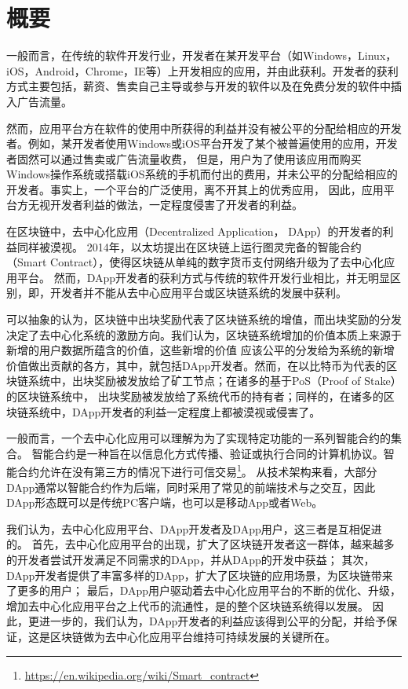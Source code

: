 \section{概要}


一般而言，在传统的软件开发行业，开发者在某开发平台（如Windows，Linux，iOS，Android，Chrome，IE等）上开发相应的应用，并由此获利。开发者的获利方式主要包括，薪资、售卖自己主导或参与开发的软件以及在免费分发的软件中插入广告流量。

然而，应用平台方在软件的使用中所获得的利益并没有被公平的分配给相应的开发者。例如，某开发者使用Windows或iOS平台开发了某个被普遍使用的应用，开发者固然可以通过售卖或广告流量收费，
但是，用户为了使用该应用而购买Windows操作系统或搭载iOS系统的手机而付出的费用，并未公平的分配给相应的开发者。事实上，一个平台的广泛使用，离不开其上的优秀应用，
因此，应用平台方无视开发者利益的做法，一定程度侵害了开发者的利益。

在区块链中，去中心化应用（Decentralized Application， DApp）的开发者的利益同样被漠视。
2014年，以太坊提出在区块链上运行图灵完备的智能合约（Smart Contract），使得区块链从单纯的数字货币支付网络升级为了去中心化应用平台。
然而，DApp开发者的获利方式与传统的软件开发行业相比，并无明显区别，即，开发者并不能从去中心应用平台或区块链系统的发展中获利。

可以抽象的认为，区块链中出块奖励代表了区块链系统的增值，而出块奖励的分发决定了去中心化系统的激励方向。我们认为，区块链系统增加的价值本质上来源于新增的用户数据所蕴含的价值，这些新增的价值
应该公平的分发给为系统的新增价值做出贡献的各方，其中，就包括DApp开发者。然而，在以比特币为代表的区块链系统中，出块奖励被发放给了矿工节点；在诸多的基于PoS（Proof of Stake）的区块链系统中，
出块奖励被发放给了系统代币的持有者；同样的，在诸多的区块链系统中，DApp开发者的利益一定程度上都被漠视或侵害了。

一般而言，一个去中心化应用可以理解为为了实现特定功能的一系列智能合约的集合。
智能合约是一种旨在以信息化方式传播、验证或执行合同的计算机协议。智能合约允许在没有第三方的情况下进行可信交易\footnote{\url{https://en.wikipedia.org/wiki/Smart\_contract}}。
从技术架构来看，大部分DApp通常以智能合约作为后端，同时采用了常见的前端技术与之交互，因此DApp形态既可以是传统PC客户端，也可以是移动App或者Web。

我们认为，去中心化应用平台、DApp开发者及DApp用户，这三者是互相促进的。
首先，去中心化应用平台的出现，扩大了区块链开发者这一群体，越来越多的开发者尝试开发满足不同需求的DApp，并从DApp的开发中获益；
其次，DApp开发者提供了丰富多样的DApp，扩大了区块链的应用场景，为区块链带来了更多的用户；
最后，DApp用户驱动着去中心化应用平台的不断的优化、升级，增加去中心化应用平台之上代币的流通性，是的整个区块链系统得以发展。
因此，更进一步的，我们认为，DApp开发者的利益应该得到公平的分配，并给予保证，这是区块链做为去中心化应用平台维持可持续发展的关键所在。

